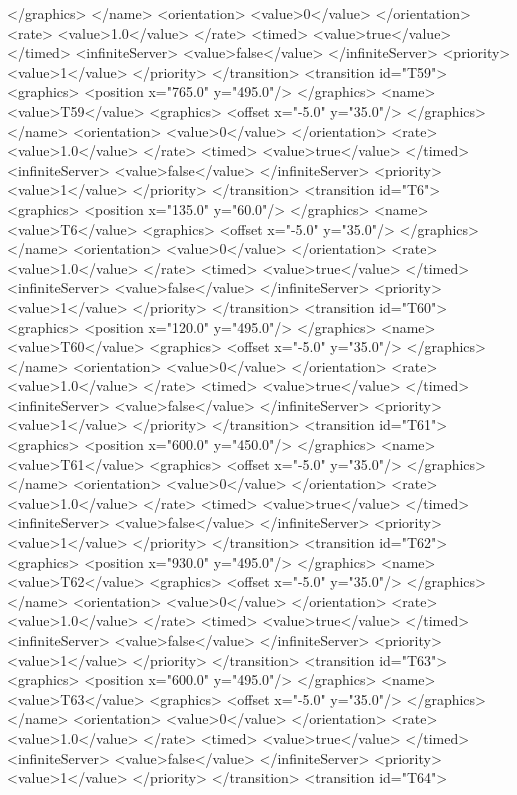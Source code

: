 </graphics>
</name>
<orientation>
<value>0</value>
</orientation>
<rate>
<value>1.0</value>
</rate>
<timed>
<value>true</value>
</timed>
<infiniteServer>
<value>false</value>
</infiniteServer>
<priority>
<value>1</value>
</priority>
</transition>
<transition id="T59">
<graphics>
<position x="765.0" y="495.0"/>
</graphics>
<name>
<value>T59</value>
<graphics>
<offset x="-5.0" y="35.0"/>
</graphics>
</name>
<orientation>
<value>0</value>
</orientation>
<rate>
<value>1.0</value>
</rate>
<timed>
<value>true</value>
</timed>
<infiniteServer>
<value>false</value>
</infiniteServer>
<priority>
<value>1</value>
</priority>
</transition>
<transition id="T6">
<graphics>
<position x="135.0" y="60.0"/>
</graphics>
<name>
<value>T6</value>
<graphics>
<offset x="-5.0" y="35.0"/>
</graphics>
</name>
<orientation>
<value>0</value>
</orientation>
<rate>
<value>1.0</value>
</rate>
<timed>
<value>true</value>
</timed>
<infiniteServer>
<value>false</value>
</infiniteServer>
<priority>
<value>1</value>
</priority>
</transition>
<transition id="T60">
<graphics>
<position x="120.0" y="495.0"/>
</graphics>
<name>
<value>T60</value>
<graphics>
<offset x="-5.0" y="35.0"/>
</graphics>
</name>
<orientation>
<value>0</value>
</orientation>
<rate>
<value>1.0</value>
</rate>
<timed>
<value>true</value>
</timed>
<infiniteServer>
<value>false</value>
</infiniteServer>
<priority>
<value>1</value>
</priority>
</transition>
<transition id="T61">
<graphics>
<position x="600.0" y="450.0"/>
</graphics>
<name>
<value>T61</value>
<graphics>
<offset x="-5.0" y="35.0"/>
</graphics>
</name>
<orientation>
<value>0</value>
</orientation>
<rate>
<value>1.0</value>
</rate>
<timed>
<value>true</value>
</timed>
<infiniteServer>
<value>false</value>
</infiniteServer>
<priority>
<value>1</value>
</priority>
</transition>
<transition id="T62">
<graphics>
<position x="930.0" y="495.0"/>
</graphics>
<name>
<value>T62</value>
<graphics>
<offset x="-5.0" y="35.0"/>
</graphics>
</name>
<orientation>
<value>0</value>
</orientation>
<rate>
<value>1.0</value>
</rate>
<timed>
<value>true</value>
</timed>
<infiniteServer>
<value>false</value>
</infiniteServer>
<priority>
<value>1</value>
</priority>
</transition>
<transition id="T63">
<graphics>
<position x="600.0" y="495.0"/>
</graphics>
<name>
<value>T63</value>
<graphics>
<offset x="-5.0" y="35.0"/>
</graphics>
</name>
<orientation>
<value>0</value>
</orientation>
<rate>
<value>1.0</value>
</rate>
<timed>
<value>true</value>
</timed>
<infiniteServer>
<value>false</value>
</infiniteServer>
<priority>
<value>1</value>
</priority>
</transition>
<transition id="T64">
